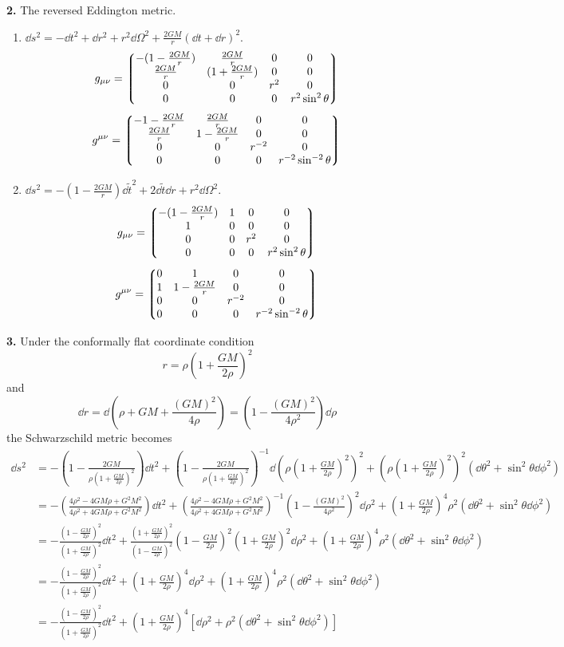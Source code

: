 \documentclass{article}
\begin{document}
{\bf2.}\quad
The reversed Eddington metric.
\begin{enumerate}
  \item $\dd s^2=-\dd t^2+\dd r^2+r^2\dd\Omega^2+\frac{2GM}{r}(\dd t+\dd r)^2$.
  $$g_{\mu\nu}=\Pmqty{-(1-\frac{2GM}{r})&\frac{2GM}{r}&0&0\\\frac{2GM}{r}&(1+\frac{2GM}{r})&0&0\\0&0&r^2&0\\0&0&0&r^2\sin^2\theta}$$
  \begin{align*}
    g^{\mu\nu}=\Pmqty{-1-\frac{2GM}{r}&\frac{2GM}{r}&0&0\\\frac{2GM}{r}&1-\frac{2GM}{r}&0&0\\0&0&r^{-2}&0\\0&0&0&r^{-2}\sin^{-2}\theta}
  \end{align*}
  \item $\dd s^2=-(1-\frac{2GM}{r})\dd\tilde t^2+2\dd\tilde t\dd r+r^2\dd\Omega^2$.
  $$g_{\mu\nu}=\Pmqty{-(1-\frac{2GM}{r})&1&0&0\\1&0&0&0\\0&0&r^2&0\\0&0&0&r^2\sin^2\theta}$$
  \begin{align*}
    g^{\mu\nu}=\Pmqty{0&1&0&0\\1&1-\frac{2GM}{r}&0&0\\0&0&r^{-2}&0\\0&0&0&r^{-2}\sin^{-2}\theta}
  \end{align*}
\end{enumerate}

{\bf3.}\quad
Under the conformally flat coordinate condition
$$r=\rho(1+\frac{GM}{2\rho})^2$$
and
$$\dd r=\dd(\rho+GM+\frac{(GM)^2}{4\rho})=(1-\frac{(GM)^2}{4\rho^2})\dd\rho$$
the Schwarzschild metric becomes
\begin{align*}
  \dd s^2&=-(1-\frac{2GM}{\rho(1+\frac{GM}{2\rho})^2})\dd t^2+(1-\frac{2GM}{\rho(1+\frac{GM}{2\rho})^2})^{-1}\dd (\rho(1+\frac{GM}{2\rho})^2)^2+(\rho(1+\frac{GM}{2\rho})^2)^2(\dd\theta^2+\sin^2\theta\dd\phi^2)\\
  &=-(\frac{4\rho^2-4GM\rho+G^2M^2}{4\rho^2+4GM\rho+G^2M^2})\dd t^2+(\frac{4\rho^2-4GM\rho+G^2M^2}{4\rho^2+4GM\rho+G^2M^2})^{-1}(1-\frac{(GM)^2}{4\rho^2})^2\dd\rho^2+(1+\frac{GM}{2\rho})^4\rho^2(\dd\theta^2+\sin^2\theta\dd\phi^2)\\
  &=-\frac{(1-\frac{GM}{2\rho})^2}{(1+\frac{GM}{2\rho})^2}\dd t^2+\frac{(1+\frac{GM}{2\rho})^2}{(1-\frac{GM}{2\rho})^2}(1-\frac{GM}{2\rho})^2(1+\frac{GM}{2\rho})^2\dd\rho^2+(1+\frac{GM}{2\rho})^4\rho^2(\dd\theta^2+\sin^2\theta\dd\phi^2)\\
  &=-\frac{(1-\frac{GM}{2\rho})^2}{(1+\frac{GM}{2\rho})^2}\dd t^2+(1+\frac{GM}{2\rho})^4\dd\rho^2+(1+\frac{GM}{2\rho})^4\rho^2(\dd\theta^2+\sin^2\theta\dd\phi^2)\\
  &=-\frac{(1-\frac{GM}{2\rho})^2}{(1+\frac{GM}{2\rho})^2}\dd t^2+(1+\frac{GM}{2\rho})^4[\dd\rho^2+\rho^2(\dd\theta^2+\sin^2\theta\dd\phi^2)]
\end{align*}
\end{document}
